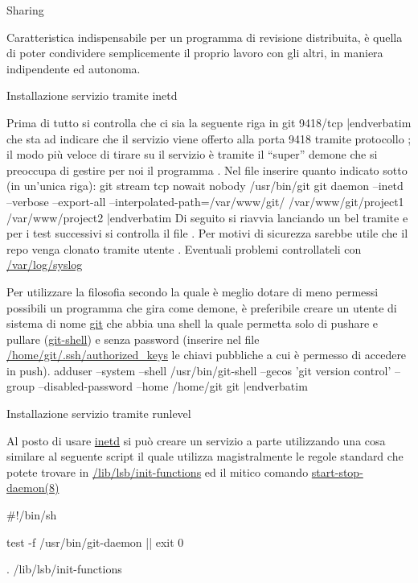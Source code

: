 \capitolo Sharing

Caratteristica indispensabile per un programma di revisione distribuita, \`e
quella di poter condividere semplicemente il proprio lavoro con gli altri, in
maniera indipendente ed autonoma.

\sezione Installazione servizio tramite inetd

Prima di tutto si controlla che ci sia la seguente riga in 
\iniziacode
git 9418/tcp
|endverbatim
\finecode
che sta ad indicare che il servizio  viene offerto alla porta 9418
tramite protocollo ; il modo pi\`u veloce di tirare su il servizio \`e
tramite il ``super'' demone  che si preoccupa di gestire per noi
il programma . Nel file  inserire quanto
indicato sotto (in un'unica riga):
\iniziacode
git stream  tcp nowait  nobody  /usr/bin/git
  git daemon --inetd --verbose --export-all --interpolated-path=/var/www/git/%
  /var/www/git/project1
  /var/www/project2
|endverbatim
\finecode
Di seguito si riavvia  lanciando un bel  tramite
 e per i test successivi si controlla il file
. Per motivi di sicurezza sarebbe utile che il repo venga
clonato tramite utente . Eventuali problemi controllateli con
\url{/var/log/syslog}

Per utilizzare la filosofia secondo la quale \`e meglio dotare di meno permessi
possibili un programma che gira come demone, \`e preferibile creare un utente di
sistema di nome \url{git} che abbia una shell la quale permetta solo di pushare
e pullare (\url{git-shell}) e senza password (inserire nel file
\url{/home/git/.ssh/authorized_keys} le chiavi pubbliche a cui \`e permesso di
accedere in push).
\iniziacode
adduser --system --shell /usr/bin/git-shell --gecos 'git version control'
--group --disabled-password --home /home/git git
|endverbatim
\finecode

\sezione Installazione servizio tramite runlevel

Al posto di usare \url{inetd} si pu\`o creare un servizio a parte utilizzando
una cosa similare al seguente script il quale utilizza magistralmente le regole
standard che potete trovare in \url{/lib/lsb/init-functions} ed il mitico
comando \url{start-stop-daemon(8)}

\iniziacode
#!/bin/sh

test -f /usr/bin/git-daemon || exit 0

. /lib/lsb/init-functions

